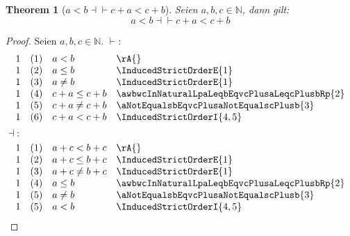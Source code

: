 \documentclass{book}
\theoremstyle{plain}
\newtheorem{theorem}{Theorem}
\theoremstyle{remark}
\theoremstyle{definition}
\begin{document}
\label{aLneqbEqvcPlusaLneqcPlusb}
\begin{theorem}[\(a<b\dashv\vdash c+a<c+b\)]
Seien \(a,b,c\in\mathbb{N}\), dann gilt:
\[a<b\dashv\vdash c+a<c+b\]
\end{theorem}
\begin{proof}
        Seien \(a,b,c\in\mathbb{N}\). 
\(\vdash:\)
\[
\begin{array}{llll}
            1 & (1) & a<b  & \rA{} \\
            1 & (2) & a\leq b  & \InducedStrictOrderE{1} \\
            1 & (3) & a\neq b  & \InducedStrictOrderE{1} \\
            1 & (4) & c+a\leq c+b  &  \awbwcInNaturalLpaLeqbEqvcPlusaLeqcPlusbRp{2} \\
            1 & (5) & c+a\neq c+b  & \aNotEqualsbEqvcPlusaNotEqualscPlusb{3} \\
            1 & (6) & c+a<c+b & \InducedStrictOrderI{4,5} \\
\end{array}
\]
\(\dashv:\)
\[
\begin{array}{llll}
            1 & (1) & a+c<b+c  & \rA{} \\
            1 & (2) & a+c\leq b+c  & \InducedStrictOrderE{1} \\
            1 & (3) & a+c\neq b+c  & \InducedStrictOrderE{1} \\
            1 & (4) & a\leq b  & \awbwcInNaturalLpaLeqbEqvcPlusaLeqcPlusbRp{2}
            \\
            1 & (5) & a\neq b  & \aNotEqualsbEqvcPlusaNotEqualscPlusb{3}
            \\
            1 & (5) & a<b  & \InducedStrictOrderI{4,5}
            \\
            
\end{array}
\]
\end{proof}
\end{document}

